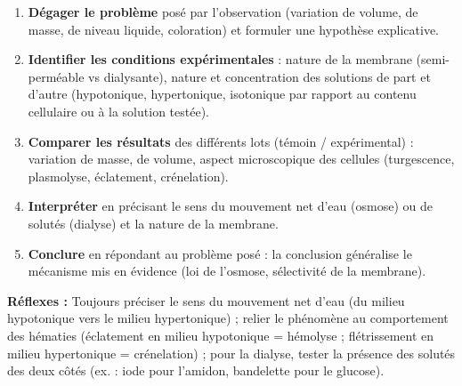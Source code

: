 \documentclass[11pt]{article}
\newcommand{\cle}[1]{{\popxbold\color{popdark}#1}}
\begin{document}
\begin{methode}
\begin{enumerate}
\item \textbf{Dégager le problème} posé par l'observation (variation de volume, de masse, de niveau liquide, coloration) et formuler une \cle{hypothèse} explicative.
\item \textbf{Identifier les conditions expérimentales} : nature de la membrane (semi-perméable vs dialysante), nature et concentration des solutions de part et d'autre (hypotonique, hypertonique, isotonique par rapport au contenu cellulaire ou à la solution testée).
\item \textbf{Comparer les résultats} des différents lots (témoin / expérimental) : variation de masse, de volume, aspect microscopique des cellules (turgescence, plasmolyse, éclatement, crénelation).
\item \textbf{Interpréter} en précisant le sens du mouvement net d'eau (osmose) ou de solutés (dialyse) et la nature de la membrane.
\item \textbf{Conclure} en répondant au problème posé : la conclusion généralise le mécanisme mis en évidence (loi de l'osmose, sélectivité de la membrane).
\end{enumerate}
\textbf{Réflexes :} Toujours préciser le sens du mouvement net d'eau (du milieu hypotonique vers le milieu hypertonique) ; relier le phénomène au comportement des hématies (éclatement en milieu hypotonique = hémolyse ; flétrissement en milieu hypertonique = crénelation) ; pour la dialyse, tester la présence des solutés des deux côtés (ex. : iode pour l'amidon, bandelette pour le glucose).
\end{methode}
\end{document}
